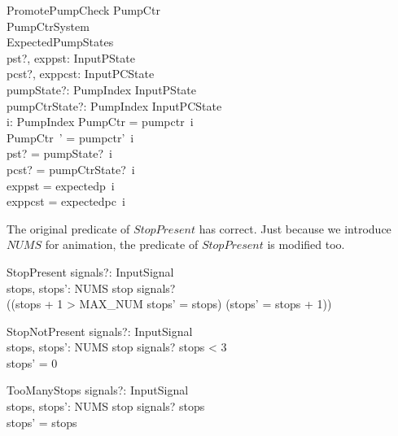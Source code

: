 \documentclass{report} %
\begin{document}
\begin{schema}{PromotePumpCheck}
  \Delta PumpCtr \\ %
  \Delta PumpCtrSystem \\ %
  ExpectedPumpStates \\ %
  pst?, exppst: InputPState \\ %
  pcst?, exppcst: InputPCState \\ %
  pumpState?: PumpIndex \fun InputPState \\ %
  pumpCtrState?: PumpIndex \fun InputPCState \\ %
  i: PumpIndex
  \where %
  \theta PumpCtr = pumpctr~i \\ %
  \theta PumpCtr~' = pumpctr'~i \\ %
  pst? = pumpState?~i \\ %
  pcst? = pumpCtrState?~i \\ %
  exppst = expectedp~i \\ %
  exppcst = expectedpc~i
\end{schema}
%
%

The original predicate of $StopPresent$ has correct. Just because we introduce $NUMS$ for animation, the predicate of $StopPresent$ is modified too.
\begin{schema}{StopPresent}
  signals?: \power InputSignal \\ %
  stops, stops': NUMS
  \where %
  stop \in signals?  \\ %
  ((stops + 1 > MAX\_NUM \land stops' = stops) \lor (stops' = stops + 1))
\end{schema}

\begin{schema}{StopNotPresent}
  signals?: \power InputSignal \\ %
  stops, stops': NUMS
  \where %
  stop \notin signals? \land stops < 3 \\ %
  stops' = 0
\end{schema}

\begin{schema}{TooManyStops}
  signals?: \power InputSignal \\ %
  stops, stops': NUMS
  \where %
  stop \notin signals? \land stops  \\ %
  stops' = stops
\end{schema}
\end{document}
